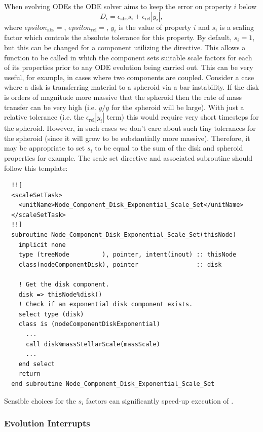 When evolving ODEs the ODE solver aims to keep the error on property $i$ below
\begin{equation}
 D_i = \epsilon_\mathrm{abs} s_i + \epsilon_\mathrm{rel} |y_i|,
\end{equation}
where $epsilon_\mathrm{abs}=$\mono{[odeToleranceAbsolute]}, $epsilon_\mathrm{rel}=$\mono{[odeToleranceRelative]}, $y_i$ is the value of property $i$ and $s_i$ is a scaling factor which controls the absolute tolerance for this property. By default, $s_i=1$, but this can be changed for a component utilizing the  directive. This allows a function to be called in which the component sets suitable scale factors for each of its properties prior to any ODE evolution being carried out. This can be very useful, for example, in cases where two components are coupled. Consider a case where a disk is transferring material to a spheroid via a bar instability. If the disk is orders of magnitude more massive that the spheroid then the rate of mass transfer can be very high (i.e. $\dot{y}/y$ for the spheroid will be large). With just a relative tolerance (i.e. the $\epsilon_\mathrm{rel} |y_i|$ term) this would require very short timesteps for the spheroid. However, in such cases we don't care about such tiny tolerances for the spheroid (since it will grow to be substantially more massive). Therefore, it may be appropriate to set $s_i$ to be equal to the sum of the disk and spheroid properties for example. The scale set directive and associated subroutine should follow this template:
\begin{verbatim}
  !![
  <scaleSetTask>
    <unitName>Node_Component_Disk_Exponential_Scale_Set</unitName>
  </scaleSetTask>
  !!]
  subroutine Node_Component_Disk_Exponential_Scale_Set(thisNode)
    implicit none
    type (treeNode         ), pointer, intent(inout) :: thisNode
    class(nodeComponentDisk), pointer                :: disk

    ! Get the disk component.
    disk => thisNode%disk()
    ! Check if an exponential disk component exists.
    select type (disk)
    class is (nodeComponentDiskExponential)
      ...
      call disk%massStellarScale(massScale)
      ...
    end select
    return
  end subroutine Node_Component_Disk_Exponential_Scale_Set
\end{verbatim}
Sensible choices for the $s_i$ factors can significantly speed-up execution of \glc.

\subsubsection{Evolution Interrupts}

